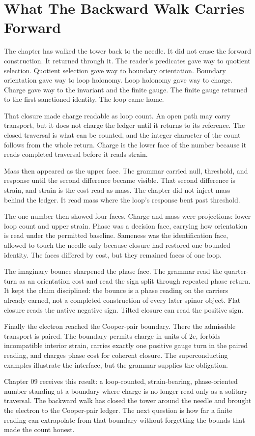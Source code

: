 \section{What The Backward Walk Carries Forward}

The chapter has walked the tower back to the needle. It did not erase the
forward construction. It returned through it. The reader's predicates gave
way to quotient selection. Quotient selection gave way to boundary
orientation. Boundary orientation gave way to loop holonomy. Loop holonomy
gave way to charge. Charge gave way to the invariant and the finite gauge.
The finite gauge returned to the first sanctioned identity. The loop came
home.

That closure made charge readable as loop count. An open path may carry
transport, but it does not charge the ledger until it returns to its
reference. The closed traversal is what can be counted, and the integer
character of the count follows from the whole return. Charge is the lower
face of the number because it reads completed traversal before it reads
strain.

Mass then appeared as the upper face. The grammar carried null, threshold,
and response until the second difference became visible. That second
difference is strain, and strain is the cost read as mass. The chapter did
not inject mass behind the ledger. It read mass where the loop's response
bent past threshold.

The one number then showed four faces. Charge and mass were projections:
lower loop count and upper strain. Phase was a decision face, carrying how
orientation is read under the permitted baseline. Sameness was the
identification face, allowed to touch the needle only because closure had
restored one bounded identity. The faces differed by cost, but they remained
faces of one loop.

The imaginary bounce sharpened the phase face. The grammar read the
quarter-turn as an orientation cost and read the sign split through repeated
phase return. It kept the claim disciplined: the bounce is a phase reading
on the carriers already earned, not a completed construction of every later
spinor object. Flat closure reads the native negative sign. Tilted closure
can read the positive sign.

Finally the electron reached the Cooper-pair boundary. There the admissible
transport is paired. The boundary permits charge in units of \(2e\), forbids
incompatible interior strain, carries exactly one positive gauge turn in the
paired reading, and charges phase cost for coherent closure. The
superconducting examples illustrate the interface, but the grammar supplies
the obligation.

Chapter 09 receives this result: a loop-counted, strain-bearing,
phase-oriented number standing at a boundary where charge is no longer read
only as a solitary traversal. The backward walk has closed the tower around
the needle and brought the electron to the Cooper-pair ledger. The next
question is how far a finite reading can extrapolate from that boundary
without forgetting the bounds that made the count honest.
